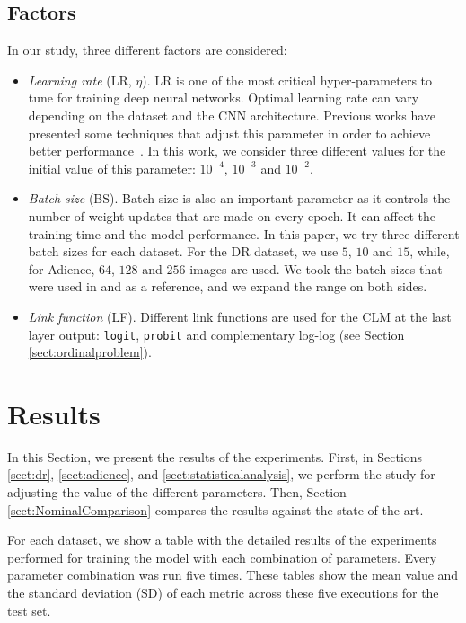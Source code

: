 \documentclass[preprint]{elsarticle}
\begin{document}
\subsection{Factors}
In our study, three different factors are considered:
\begin{itemize}
	\item \textit{Learning rate} (LR, $\eta$). LR is one of the most critical hyper-parameters to tune for training deep neural networks. Optimal learning rate can vary depending on the dataset and the CNN architecture. Previous works have presented some techniques that adjust this parameter in order to achieve better performance~\cite{smith2017cyclical,senior2013empirical}. In this work, we consider three different values for the initial value of this parameter: $10^{-4}$, $10^{-3}$ and $10^{-2}$.
	\item \textit{Batch size} (BS). Batch size is also an important parameter as it controls the number of weight updates that are made on every epoch. It can affect the training time and the model performance. In this paper, we try three different batch sizes for each dataset. For the DR dataset, we use $5$, $10$ and $15$, while, for Adience, $64$, $128$ and $256$ images are used. We took the batch sizes that were used in \cite{de2018weighted} and \cite{beckham2017unimodal} as a reference, and we expand the range on both sides.
	\item \textit{Link function} (LF). Different link functions are used for the CLM at the last layer output: \texttt{logit}, \texttt{probit} and complementary log-log (see Section \ref{sect:ordinalproblem}).
\end{itemize}

\section{Results}
\label{sect:results}
In this Section, we present the results of the experiments. First, in Sections \ref{sect:dr}, \ref{sect:adience}, and \ref{sect:statisticalanalysis}, we perform the study for adjusting the value of the different parameters. Then, Section \ref{sect:NominalComparison} compares the results against the state of the art.

For each dataset, we show a table with the detailed results of the experiments performed for training the model with each combination of parameters. Every parameter combination was run five times. These tables show the mean value and the standard deviation (SD) of each metric across these five executions for the test set.
\end{document}
